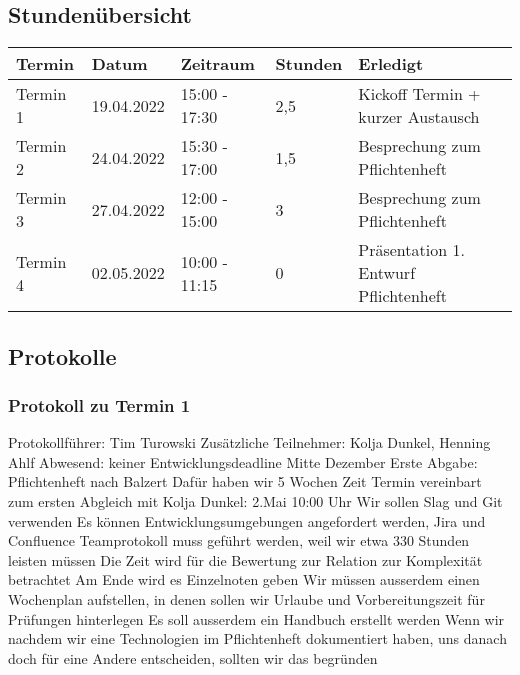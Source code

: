 \subsection{Stundenübersicht}

\begin{tabular}{|l|l|l|l|l|}
\hline
Termin & Datum & Zeitraum & Stunden & Erledigt \\
\hline
    Termin 1 & 19.04.2022 & 15:00 - 17:30 & 2,5 & Kickoff Termin + kurzer Austausch \\
	Termin 2 & 24.04.2022 & 15:30 - 17:00 & 1,5 & Besprechung zum Pflichtenheft \\
	Termin 3 & 27.04.2022 & 12:00 - 15:00 & 3 & Besprechung zum Pflichtenheft \\
	Termin 4 & 02.05.2022 & 10:00 - 11:15 & 0 & Präsentation 1. Entwurf Pflichtenheft \\
\hline
\end{tabular}

\subsection{Protokolle}
\subsubsection{Protokoll zu Termin 1}
Protokollführer: Tim Turowski \newline
Zusätzliche Teilnehmer: Kolja Dunkel, Henning Ahlf \newline
Abwesend: keiner \newline \newline
Entwicklungsdeadline Mitte Dezember \newline
Erste Abgabe: Pflichtenheft nach Balzert \newline
Dafür haben wir 5 Wochen Zeit \newline
Termin vereinbart zum ersten Abgleich mit Kolja Dunkel: 2.Mai 10:00 Uhr \newline
Wir sollen Slag und Git verwenden \newline
Es können Entwicklungsumgebungen angefordert werden, Jira und Confluence \newline
Teamprotokoll muss geführt werden, weil wir etwa 330 Stunden leisten müssen \newline
Die Zeit wird für die Bewertung zur Relation zur Komplexität betrachtet \newline
Am Ende wird es Einzelnoten geben \newline
Wir müssen ausserdem einen Wochenplan aufstellen, in denen sollen wir Urlaube und Vorbereitungszeit für Prüfungen hinterlegen \newline
Es soll ausserdem ein Handbuch erstellt werden \newline
Wenn wir nachdem wir eine Technologien im Pflichtenheft dokumentiert haben, uns danach doch für eine Andere entscheiden, sollten wir das begründen 

